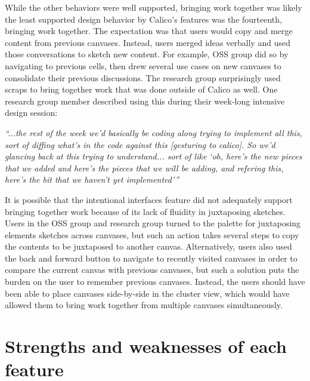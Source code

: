 \documentclass[12pt,fleqn]{ucithesis}
\begin{document}

While the other behaviors were well supported, bringing work together was likely the least supported design behavior by Calico's features was the fourteenth, bringing work together. The expectation was that users would copy and merge content from previous canvases. Instead, users merged ideas verbally and used those conversations to sketch new content. For example, OSS group did so by navigating to previous cells, then drew several use cases on new canvases to consolidate their previous discussions. The research group surprisingly used scraps to bring together work that was done outside of Calico as well. One research group member described using this during their week-long intensive design session: 

\begin{myindentpar}{1cm}
\emph{``...the rest of the week we'd basically be coding along trying to implement all this, sort of diffing what's in the code against this [gesturing to calico]. So we'd glancing back at this trying to understand... sort of like `oh, here's the new pieces that we added and here's the pieces that we will be adding, and refering this, here's the bit that we haven't yet implemented'''}
\end{myindentpar}

It is possible that the intentional interfaces feature did not adequately support bringing together work because of its lack of fluidity in juxtaposing sketches. Users in the OSS group and research group turned to the palette for juxtaposing elements sketches across canvases, but such an action takes several steps to copy the contents to be juxtaposed to another canvas. Alternatively, users also used the back and forward button to navigate to recently visited canvases in order to compare the current canvas with previous canvases, but such a solution puts the burden on the user to remember previous canvases. Instead, the users should have been able to place canvases side-by-side in the cluster view, which would have allowed them to bring work together from multiple canvases simultaneously.

\section{Strengths and weaknesses of each feature}
\label{discussion:strengths-and-weaknesses}
\end{document}
